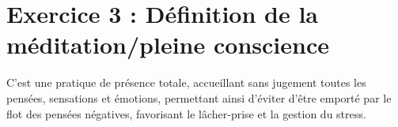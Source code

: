\documentclass[a4paper,12pt]{article}
\begin{document}
\section*{Exercice 3 : Définition de la méditation/pleine conscience}

C'est une pratique de présence totale, accueillant sans jugement toutes les pensées, sensations et émotions, permettant ainsi d'éviter d'être emporté par le flot des pensées négatives, favorisant le lâcher-prise et la gestion du stress.
\end{document}
